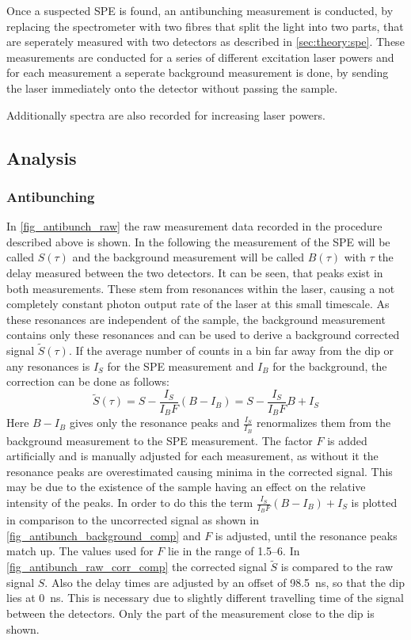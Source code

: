 Once a suspected SPE is found, an antibunching measurement is conducted, by replacing the spectrometer with two fibres that split the light into two parts, that are seperately measured with two detectors as described in \cref{sec:theory:spe}.
These measurements are conducted for a series of different excitation laser powers and for each measurement a seperate background measurement is done, by sending the laser immediately onto the detector without passing the sample.

Additionally spectra are also recorded for increasing laser powers. %

\subsection{Analysis}
\subsubsection{Antibunching}
\label{sec:spe:analysis:antibunch}

In \cref{fig_antibunch_raw} the raw measurement data recorded in the procedure described above is shown.
In the following the measurement of the SPE will be called $S(\tau)$ and the background measurement will be called $B(\tau)$ with $\tau$ the delay measured between the two detectors.
It can be seen, that peaks exist in both measurements.
These stem from resonances within the laser, causing a not completely constant photon output rate of the laser at this small timescale.
As these resonances are independent of the sample, the background measurement contains only these resonances and can be used to derive a background corrected signal $\tilde{S} (\tau)$.
If the average number of counts in a bin far away from the dip or any resonances is $I_S$ for the SPE measurement and $I_B$ for the background, the correction can be done as follows:
\begin{equation}
  \tilde{S} (\tau) = S - \frac{I_S}{I_B F} (B-I_B) = S - \frac{I_S}{I_B F} B + I_S
\end{equation}
Here $B-I_B$ gives only the resonance peaks and $\frac{I_S}{I_B}$ renormalizes them from the background measurement to the SPE measurement.
The factor $F$ is added artificially and is manually adjusted for each measurement, as without it the resonance peaks are overestimated causing minima in the corrected signal.
This may be due to the existence of the sample having an effect on the relative intensity of the peaks.
In order to do this the term $\frac{I_S}{I_B F} (B-I_B) + I_S$ is plotted in comparison to the uncorrected signal as shown in \cref{fig_antibunch_background_comp} and $F$ is adjusted, until the resonance peaks match up.
The values used for $F$ lie in the range of \SIrange{1,5}{6}{}.
In \cref{fig_antibunch_raw_corr_comp} the corrected signal $\tilde{S}$ is compared to the raw signal $S$.
Also the delay times are adjusted by an offset of \SI{98,5}{ns}, so that the dip lies at \SI{0}{ns}.
This is necessary due to slightly different travelling time of the signal between the detectors.
Only the part of the measurement close to the dip is shown.


